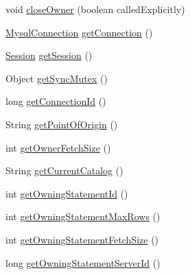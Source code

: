 \begin{DoxyCompactItemize}
\item 
void \mbox{\hyperlink{interfacecom_1_1mysql_1_1cj_1_1protocol_1_1_resultset_rows_owner_a9ac322b27f59633cab6d7b1148545f73}{close\+Owner}} (boolean called\+Explicitly)
\item 
\mbox{\hyperlink{interfacecom_1_1mysql_1_1cj_1_1_mysql_connection}{Mysql\+Connection}} \mbox{\hyperlink{interfacecom_1_1mysql_1_1cj_1_1protocol_1_1_resultset_rows_owner_a8bc104d4800ae94bdb0988a9510e71ea}{get\+Connection}} ()
\item 
\mbox{\hyperlink{interfacecom_1_1mysql_1_1cj_1_1_session}{Session}} \mbox{\hyperlink{interfacecom_1_1mysql_1_1cj_1_1protocol_1_1_resultset_rows_owner_a4db30351e43e500e977f3bee6d667fb8}{get\+Session}} ()
\item 
Object \mbox{\hyperlink{interfacecom_1_1mysql_1_1cj_1_1protocol_1_1_resultset_rows_owner_ae1c4062c21dff082c4f8ab97c59b33c3}{get\+Sync\+Mutex}} ()
\item 
long \mbox{\hyperlink{interfacecom_1_1mysql_1_1cj_1_1protocol_1_1_resultset_rows_owner_abf4aad452e523576633b260da5c697c9}{get\+Connection\+Id}} ()
\item 
String \mbox{\hyperlink{interfacecom_1_1mysql_1_1cj_1_1protocol_1_1_resultset_rows_owner_ae8c8b074a381de4bf3b25dc53e4ee079}{get\+Point\+Of\+Origin}} ()
\item 
int \mbox{\hyperlink{interfacecom_1_1mysql_1_1cj_1_1protocol_1_1_resultset_rows_owner_aa6b1c5919d5d1ad830d40b689f19fc9d}{get\+Owner\+Fetch\+Size}} ()
\item 
String \mbox{\hyperlink{interfacecom_1_1mysql_1_1cj_1_1protocol_1_1_resultset_rows_owner_a516c2a11a4fe4c9f0266ebb8d6c32cfd}{get\+Current\+Catalog}} ()
\item 
int \mbox{\hyperlink{interfacecom_1_1mysql_1_1cj_1_1protocol_1_1_resultset_rows_owner_ad896e6bd0af502d4fddc3938b3193953}{get\+Owning\+Statement\+Id}} ()
\item 
int \mbox{\hyperlink{interfacecom_1_1mysql_1_1cj_1_1protocol_1_1_resultset_rows_owner_aede3182d876d3c1806e1240805162ea2}{get\+Owning\+Statement\+Max\+Rows}} ()
\item 
int \mbox{\hyperlink{interfacecom_1_1mysql_1_1cj_1_1protocol_1_1_resultset_rows_owner_af003a626e00ebe4267a97322257bac67}{get\+Owning\+Statement\+Fetch\+Size}} ()
\item 
long \mbox{\hyperlink{interfacecom_1_1mysql_1_1cj_1_1protocol_1_1_resultset_rows_owner_a1f6631c7c96a5ea02755ef4e2605916d}{get\+Owning\+Statement\+Server\+Id}} ()
\end{DoxyCompactItemize}



